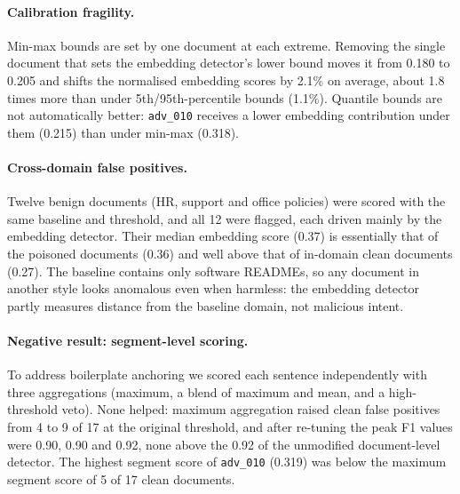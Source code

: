 \paragraph{Calibration fragility.}\label{sec:calibration-fragility}
Min-max bounds are set by one document at each extreme. Removing the single
document that sets the embedding detector's lower bound moves it from 0.180 to
0.205 and shifts the normalised embedding scores by 2.1\% on average, about 1.8
times more than under 5th/95th-percentile bounds (1.1\%). Quantile bounds are not
automatically better: \texttt{adv\_010} receives a lower embedding contribution
under them (0.215) than under min-max (0.318).

\paragraph{Cross-domain false positives.}
Twelve benign documents (HR, support and office policies) were scored with the
same baseline and threshold, and all 12 were flagged, each driven mainly by the
embedding detector. Their median embedding score (0.37) is essentially that of
the poisoned documents (0.36) and well above that of in-domain clean documents
(0.27). The baseline contains only software READMEs, so any document in another
style looks anomalous even when harmless: the embedding detector partly measures
distance from the baseline domain, not malicious intent.

\paragraph{Negative result: segment-level scoring.}
To address boilerplate anchoring we scored each sentence independently with three
aggregations (maximum, a blend of maximum and mean, and a high-threshold veto).
None helped: maximum aggregation raised clean false positives from 4 to 9 of 17
at the original threshold, and after re-tuning the peak F1 values were 0.90, 0.90
and 0.92, none above the 0.92 of the unmodified document-level detector. The
highest segment score of \texttt{adv\_010} (0.319) was below the maximum segment
score of 5 of 17 clean documents.